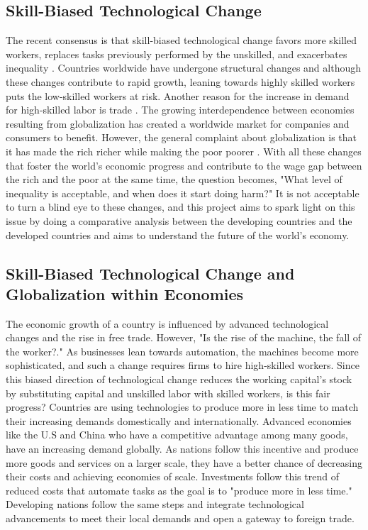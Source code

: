 \documentclass[12pt,oneside]{book} %
\begin{document}
\subsection{Skill-Biased Technological Change}
The recent consensus is that skill-biased technological change favors more skilled workers, replaces tasks previously performed by the unskilled, and exacerbates inequality \cite{acemoglu2002technical}. Countries worldwide have undergone structural changes and although these changes contribute to rapid growth, leaning towards highly skilled workers puts the low-skilled workers at risk. Another reason for the increase in demand for high-skilled labor is trade \cite{kang2002technological}. The growing interdependence between economies resulting from globalization has created a worldwide market for companies and consumers to benefit. However, the general complaint about globalization is that it has made the rich richer while making the poor poorer \cite{collins_2015}. With all these changes that foster the world's economic progress and contribute to the wage gap between the rich and the poor at the same time, the question becomes, "What level of inequality is acceptable, and when does it start doing harm?" It is not acceptable to turn a blind eye to these changes, and this project aims to spark light on this issue by doing a comparative analysis between the developing countries and the developed countries and aims to understand the future of the world's economy.  

\subsection{Skill-Biased Technological Change and Globalization within Economies}

\hspace{20pt}The economic growth of a country is influenced by advanced technological changes and the rise in free trade. However, "Is the rise of the machine, the fall of the worker?." As businesses lean towards automation, the machines become more sophisticated, and such a change requires firms to hire high-skilled workers. Since this biased direction of technological change reduces the working capital's stock by substituting capital and unskilled labor with skilled workers, is this fair progress? Countries are using technologies to produce more in less time to match their increasing demands domestically and internationally. Advanced economies like the U.S and China who have a competitive advantage among many goods, have an increasing demand globally. As nations follow this incentive and produce more goods and services on a larger scale, they have a better chance of decreasing their costs and achieving economies of scale. Investments follow this trend of reduced costs that automate tasks as the goal is to "produce more in less time." Developing nations follow the same steps and integrate technological advancements to meet their local demands and open a gateway to foreign trade.
\end{document}
